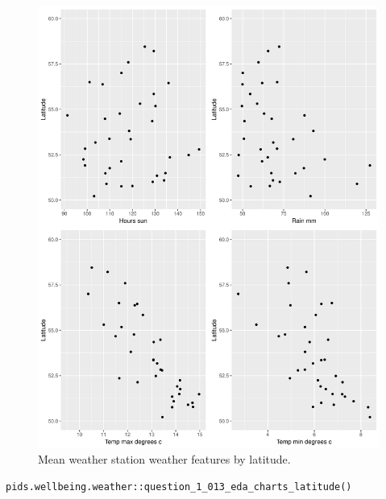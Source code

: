 \documentclass[12pt, oneside, openany]{book}
\begin{document}
\begin{figure}
	\centering
	\captionsetup{justification=centering}
	\includegraphics[scale=0.7]{question_1_013_eda_charts_latitude}
	\caption{Mean weather station weather features by latitude.}
	\label{fig:question_1_013_eda_charts_latitude}
\end{figure}

\bigskip
\begin{lstlisting}
pids.wellbeing.weather::question_1_013_eda_charts_latitude()
\end{lstlisting}
\end{document}
